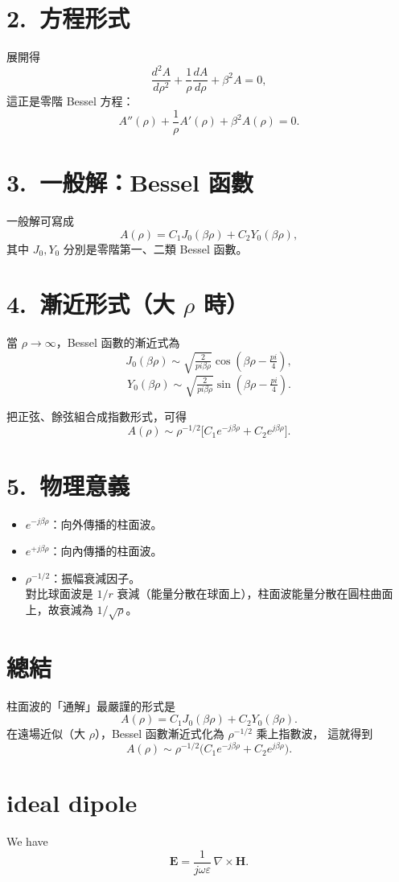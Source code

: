 \documentclass{article}
\def\pi{pi}%
\begin{document}
\section*{2.~方程形式}
展開得
\[
\frac{d^2 A}{d\rho^2} + \frac{1}{\rho}\frac{dA}{d\rho} + \beta^2 A = 0,
\]
這正是零階 Bessel 方程：
\[
A''(\rho) + \frac{1}{\rho} A'(\rho) + \beta^2 A(\rho) = 0.
\]

\section*{3.~一般解：Bessel 函數}
一般解可寫成
\[
A(\rho) = C_1 J_0(\beta\rho) + C_2 Y_0(\beta\rho),
\]
其中 $J_0, Y_0$ 分別是零階第一、二類 Bessel 函數。

\section*{4.~漸近形式（大 $\rho$ 時）}
當 $\rho \to \infty$，Bessel 函數的漸近式為
\[
J_0(\beta\rho) \sim \sqrt{\tfrac{2}{\pi \beta \rho}} \cos\!\left(\beta\rho - \tfrac{\pi}{4}\right),
\]
\[
Y_0(\beta\rho) \sim \sqrt{\tfrac{2}{\pi \beta \rho}} \sin\!\left(\beta\rho - \tfrac{\pi}{4}\right).
\]

把正弦、餘弦組合成指數形式，可得
\[
A(\rho) \sim \rho^{-1/2}\Big[C_1 e^{-j\beta\rho} + C_2 e^{j\beta\rho}\Big].
\]

\section*{5.~物理意義}
\begin{itemize}
    \item $e^{-j\beta\rho}$：向外傳播的柱面波。
    \item $e^{+j\beta\rho}$：向內傳播的柱面波。
    \item $\rho^{-1/2}$：振幅衰減因子。\\
    對比球面波是 $1/r$ 衰減（能量分散在球面上），柱面波能量分散在圓柱曲面上，故衰減為 $1/\sqrt{\rho}$。
\end{itemize}

\section*{總結}
柱面波的「通解」最嚴謹的形式是
\[
A(\rho) = C_1 J_0(\beta\rho) + C_2 Y_0(\beta\rho).
\]
在遠場近似（大 $\rho$），Bessel 函數漸近式化為 $\rho^{-1/2}$ 乘上指數波，
這就得到
\[
A(\rho) \sim \rho^{-1/2}\Big(C_1 e^{-j\beta\rho} + C_2 e^{j\beta\rho}\Big).
\]
\section{ideal dipole}
We have
\[
\mathbf{E} = \frac{1}{j\omega \varepsilon} \, \nabla \times \mathbf{H}.
\]
\end{document}
